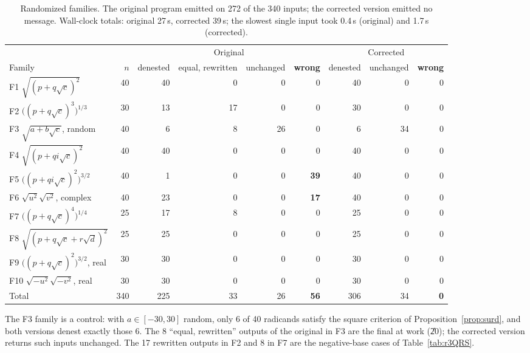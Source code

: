 \begin{table}[h]\centering\scriptsize\setlength{\tabcolsep}{3.5pt}
\begin{tabular}{@{}l r rrrr rrr@{}}
\toprule
& & \multicolumn{4}{c}{Original} & \multicolumn{3}{c}{Corrected}\\
\cmidrule(lr){3-6}\cmidrule(lr){7-9}
Family & $n$ & denested & equal, rewritten & unchanged & \textbf{wrong} & denested & unchanged & \textbf{wrong}\\\midrule
F1 $\sqrt{(p+q\sqrt c)^2}$ & 40 & 40 & 0 & 0 & 0 & 40 & 0 & 0\\
F2 $\big((p+q\sqrt c)^3\big)^{1/3}$ & 30 & 13 & 17 & 0 & 0 & 30 & 0 & 0\\
F3 $\sqrt{a+b\sqrt c}$, random & 40 & 6 & 8 & 26 & 0 & 6 & 34 & 0\\
F4 $\sqrt{(p+qi\sqrt c)^2}$ & 40 & 40 & 0 & 0 & 0 & 40 & 0 & 0\\
F5 $\big((p+qi\sqrt c)^2\big)^{3/2}$ & 40 & 1 & 0 & 0 & \textbf{39} & 40 & 0 & 0\\
F6 $\sqrt{u^2}\sqrt{v^2}$, complex & 40 & 23 & 0 & 0 & \textbf{17} & 40 & 0 & 0\\
F7 $\big((p+q\sqrt c)^4\big)^{1/4}$ & 25 & 17 & 8 & 0 & 0 & 25 & 0 & 0\\
F8 $\sqrt{(p+q\sqrt c+r\sqrt d)^2}$ & 25 & 25 & 0 & 0 & 0 & 25 & 0 & 0\\
F9 $\big((p+q\sqrt c)^2\big)^{3/2}$, real & 30 & 30 & 0 & 0 & 0 & 30 & 0 & 0\\
F10 $\sqrt{-u^2}\sqrt{-v^2}$, real & 30 & 30 & 0 & 0 & 0 & 30 & 0 & 0\\
\midrule
Total & 340 & 225 & 33 & 26 & \textbf{56} & 306 & 34 & \textbf{0}\\
\bottomrule
\end{tabular}
\caption{Randomized families. The original program emitted
 on 272 of the 340 inputs; the corrected version
emitted no message. Wall-clock totals: original 27\,s, corrected 39\,s;
the slowest single input took 0.4\,s (original) and 1.7\,s (corrected).}
\label{tab:fuzz}
\end{table}

The F3 family is a control: with $a\in[-30,30]$ random, only 6 of 40
radicands satisfy the square criterion of Proposition~\ref{prop:surd}, and
both versions denest exactly those 6. The 8 ``equal, rewritten'' outputs of
the original in F3 are the final  at work (\U{20}); the
corrected version returns such inputs unchanged. The 17 rewritten outputs in
F2 and 8 in F7 are the negative-base cases of Table~\ref{tab:r3QRS}.

